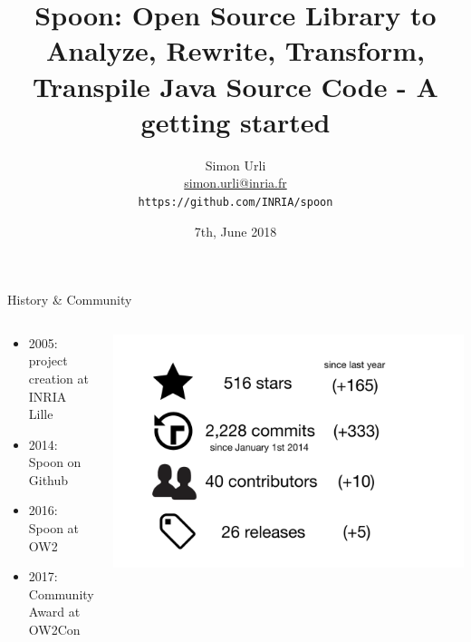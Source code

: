 \documentclass{beamer}
\title[Spoon: a multi-tool Java library for Java]{Spoon: Open Source Library to Analyze, Rewrite, Transform, Transpile Java Source Code - A getting started} %
\author{Simon Urli \\ \url{simon.urli@inria.fr} \\\texttt{https://github.com/INRIA/spoon}} %
\institute[Inria \& University of Lille] %
{
\medskip
\textit{OW2Con'18}\\ %
\medskip
\vspace{px}
}
\date{7th, June 2018} %
\begin{document}
\begin{frame}
\maketitle
\end{frame}

\begin{frame}{History \& Community}
\begin{columns}
\begin{column}{0.5\textwidth}
\begin{itemize}
\item 2005: project creation at INRIA Lille
\item 2014: Spoon on Github
\item 2016: Spoon at OW2
\item 2017: Community Award at OW2Con
\end{itemize}
\end{column}
\begin{column}{0.6\textwidth}  %
   \begin{center}
   \includegraphics[width=\textwidth]{figures/title/stats.pdf}
   \end{center}
\end{column}
\end{columns}


\end{frame}
\end{document}
